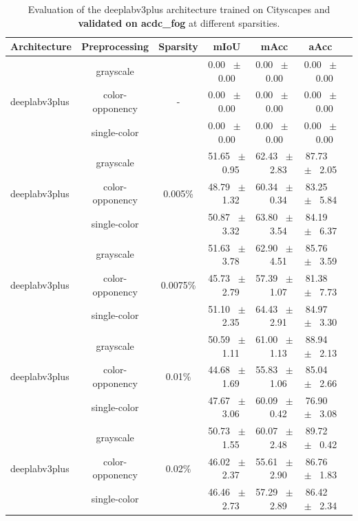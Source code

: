 \begin{table}[h]
  \centering
  \caption{Evaluation of the deeplabv3plus architecture trained on Cityscapes and \textbf{validated on acdc_fog} at different sparsities.}
  \begin{tabular}{@{}lccc ccc@{}}
    \toprule
    Architecture & Preprocessing & Sparsity & mIoU & mAcc & aAcc \\
    \midrule
    \midrule
    \midrule
    \multirow{3}{*}{deeplabv3plus} & grayscale & \multirow{3}{*}{-} & 0.00 ~$\pm$~ 0.00 & 0.00 ~$\pm$~ 0.00 & 0.00 ~$\pm$~ 0.00 \\
    & color-opponency & & 0.00 ~$\pm$~ 0.00 & 0.00 ~$\pm$~ 0.00 & 0.00 ~$\pm$~ 0.00 \\
    & single-color & & 0.00 ~$\pm$~ 0.00 & 0.00 ~$\pm$~ 0.00 & 0.00 ~$\pm$~ 0.00 \\
    \midrule
    \multirow{3}{*}{deeplabv3plus} & grayscale & \multirow{3}{*}{0.005\%} & 51.65 ~$\pm$~ 0.95 & 62.43 ~$\pm$~ 2.83 & 87.73 ~$\pm$~ 2.05 \\
    & color-opponency & & 48.79 ~$\pm$~ 1.32 & 60.34 ~$\pm$~ 0.34 & 83.25 ~$\pm$~ 5.84 \\
    & single-color & & 50.87 ~$\pm$~ 3.32 & 63.80 ~$\pm$~ 3.54 & 84.19 ~$\pm$~ 6.37 \\
    \midrule
    \multirow{3}{*}{deeplabv3plus} & grayscale & \multirow{3}{*}{0.0075\%} & 51.63 ~$\pm$~ 3.78 & 62.90 ~$\pm$~ 4.51 & 85.76 ~$\pm$~ 3.59 \\
    & color-opponency & & 45.73 ~$\pm$~ 2.79 & 57.39 ~$\pm$~ 1.07 & 81.38 ~$\pm$~ 7.73 \\
    & single-color & & 51.10 ~$\pm$~ 2.35 & 64.43 ~$\pm$~ 2.91 & 84.97 ~$\pm$~ 3.30 \\
    \midrule
    \multirow{3}{*}{deeplabv3plus} & grayscale & \multirow{3}{*}{0.01\%} & 50.59 ~$\pm$~ 1.11 & 61.00 ~$\pm$~ 1.13 & 88.94 ~$\pm$~ 2.13 \\
    & color-opponency & & 44.68 ~$\pm$~ 1.69 & 55.83 ~$\pm$~ 1.06 & 85.04 ~$\pm$~ 2.66 \\
    & single-color & & 47.67 ~$\pm$~ 3.06 & 60.09 ~$\pm$~ 0.42 & 76.90 ~$\pm$~ 3.08 \\
    \midrule
    \multirow{3}{*}{deeplabv3plus} & grayscale & \multirow{3}{*}{0.02\%} & 50.73 ~$\pm$~ 1.55 & 60.07 ~$\pm$~ 2.48 & 89.72 ~$\pm$~ 0.42 \\
    & color-opponency & & 46.02 ~$\pm$~ 2.37 & 55.61 ~$\pm$~ 2.90 & 86.76 ~$\pm$~ 1.83 \\
    & single-color & & 46.46 ~$\pm$~ 2.73 & 57.29 ~$\pm$~ 2.89 & 86.42 ~$\pm$~ 2.34 \\
    \midrule
    \bottomrule
  \end{tabular}
  \label{tab:sparse_deeplabv3plus_acdc_fog}
\end{table}
